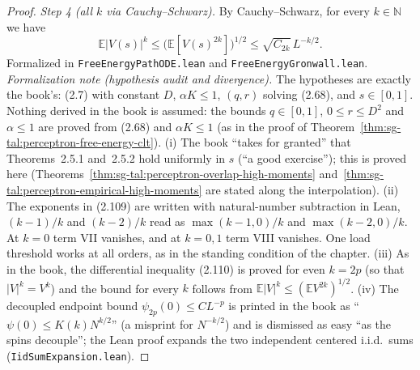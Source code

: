 \begin{proof}
\emph{Step 4 (all $k$ via Cauchy--Schwarz).} By Cauchy--Schwarz, for every $k\in\mathbb N$ we have
\[
 \mathbb E|V(s)|^k\le\bigl(\mathbb E[V(s)^{2k}]\bigr)^{1/2}\le\sqrt{C_{2k}}\,L^{-k/2}.
\]
Formalized in \texttt{FreeEnergyPathODE.lean} and \texttt{FreeEnergyGronwall.lean}.
\emph{Formalization note (hypothesis audit and divergence).} The hypotheses are exactly the book's: (2.7) with constant $D$,
$\alpha K\le 1$, $(q,r)$ solving (2.68), and $s\in[0,1]$. Nothing derived in the book is assumed: the bounds $q\in[0,1]$, $0\le r\le D^2$ and $\alpha\le1$ are
proved from (2.68) and $\alpha K\le1$ (as in the proof of Theorem~\ref{thm:sg-tal:perceptron-free-energy-clt}). (i) The book ``takes for granted''
that Theorems~2.5.1 and~2.5.2 hold uniformly in $s$ (``a good exercise''); this is proved here
(Theorems~\ref{thm:sg-tal:perceptron-overlap-high-moments} and~\ref{thm:sg-tal:perceptron-empirical-high-moments} are stated along the
interpolation). (ii) The exponents in (2.109) are written with natural-number subtraction in Lean, $(k-1)/k$ and $(k-2)/k$ read as
$\max(k-1,0)/k$ and $\max(k-2,0)/k$. At $k=0$ term VII vanishes, and at $k=0,1$ term VIII vanishes.
One load threshold works at all orders, as in the standing condition of the chapter.
(iii) As in the book, the differential inequality (2.110) is proved for even $k=2p$ (so that $|V|^k=V^k$) and the bound for every $k$ follows from
$\mathbb E|V|^k\le(\mathbb E V^{2k})^{1/2}$. (iv) The decoupled endpoint bound $\psi_{2p}(0)\le C L^{-p}$ is printed in the book as ``$\psi(0)\le K(k)N^{k/2}$'' (a misprint for $N^{-k/2}$)
and is dismissed as easy ``as the spins decouple''; the Lean proof expands the two independent centered i.i.d.\ sums (\texttt{IidSumExpansion.lean}).
\end{proof}

